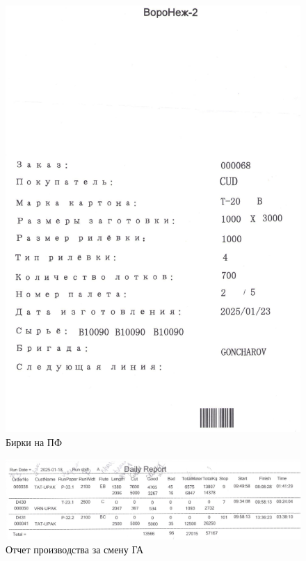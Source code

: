 \begin{figure}
\begin{center}
 \includegraphics[width=\linewidth, height=0.94\textheight, keepaspectratio]{Pics/f31.jpg}
\end{center}
\caption{Бирки на ПФ}
\label{pic:f31}
\end{figure}

\begin{figure}
\begin{center}
 \includegraphics[width=\linewidth, height=0.94\textheight, keepaspectratio]{Pics/d6.jpg}
\end{center}
\caption{Отчет производства за смену ГА}
\label{pic:d6}
\end{figure}

